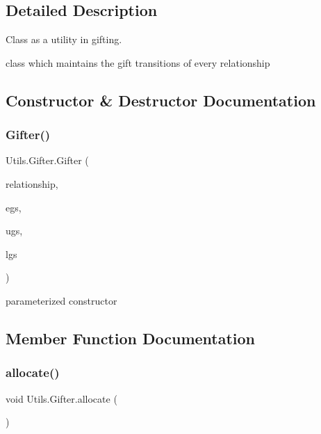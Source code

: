 \subsection{Detailed Description}
Class as a utility in gifting. 

class which maintains the gift transitions of every relationship 

\subsection{Constructor \& Destructor Documentation}
\mbox{\label{class_utils_1_1_gifter_a984afd4a0df402d995a65ba0a488db42}} 
\subsubsection{\texorpdfstring{Gifter()}{Gifter()}}
{\footnotesize\ttfamily Utils.\+Gifter.\+Gifter (\begin{DoxyParamCaption}\item[{\hyperlink{class_utils_1_1_relationship}{Relationship}}]{relationship,  }\item[{Array\+List$<$ \hyperlink{class_gifts_1_1_essential_gift}{Essential\+Gift} $>$}]{egs,  }\item[{Array\+List$<$ \hyperlink{class_gifts_1_1_utility_gift}{Utility\+Gift} $>$}]{ugs,  }\item[{Array\+List$<$ \hyperlink{class_gifts_1_1_luxury_gift}{Luxury\+Gift} $>$}]{lgs }\end{DoxyParamCaption})\hspace{0.3cm}{\ttfamily [inline]}}

parameterized constructor 

\subsection{Member Function Documentation}
\mbox{\label{class_utils_1_1_gifter_ae500c74a00252fadff550c52d4dda5df}} 
\subsubsection{\texorpdfstring{allocate()}{allocate()}}
{\footnotesize\ttfamily void Utils.\+Gifter.\+allocate (\begin{DoxyParamCaption}{ }\end{DoxyParamCaption})\hspace{0.3cm}{\ttfamily [inline]}}

